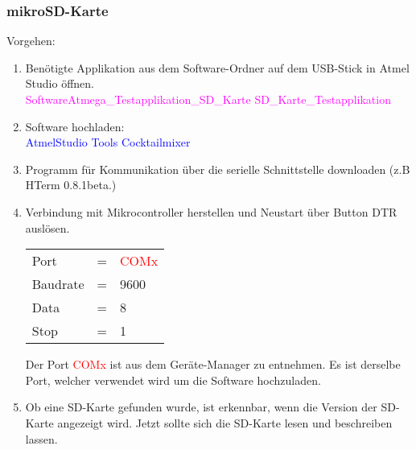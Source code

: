 \subsubsection{mikroSD-Karte}
\label{subsubsec:Inbetriebnahme_mikroSD_Karte}

Vorgehen:
\begin{enumerate}
\item Benötigte Applikation aus dem Software-Ordner auf dem USB-Stick in Atmel Studio öffnen.\\
\textcolor{magenta}{Software\textrightarrow Atmega\_Testapplikation\_SD\_Karte \textrightarrow SD\_Karte\_Testapplikation}\\

\item Software hochladen:\\
\textcolor{blue}{AtmelStudio \textrightarrow Tools \textrightarrow Cocktailmixer}\\

\item Programm für Kommunikation über die serielle Schnittstelle downloaden (z.B HTerm 0.8.1beta.)\cite{hammer_hterm_nodate}\\
\item Verbindung mit Mikrocontroller herstellen und Neustart über Button DTR auslösen.\\

\begin{table}[h!]
\center
\begin{tabular}{lcl}
Port & = & \textcolor{red}{COMx} \\
Baudrate & = & 9600 \\
Data & = & 8 \\
Stop & = & 1 \\
\end{tabular}
\end{table}

Der Port \textcolor{red}{COMx} ist aus dem Geräte-Manager zu entnehmen. Es ist derselbe Port, welcher verwendet wird um die Software hochzuladen.\\

\item Ob eine SD-Karte gefunden wurde, ist erkennbar, wenn die Version der SD-Karte angezeigt wird. Jetzt sollte sich die SD-Karte lesen und beschreiben lassen.

\end{enumerate}
